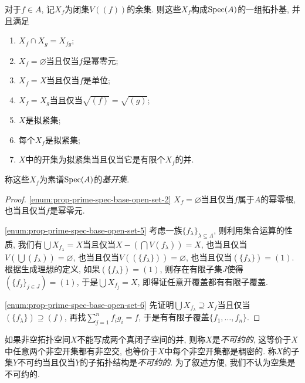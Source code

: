 \begin{proposition}\label{prop:primespecbaseopenset}
  对于$f\in A$, 记$X_f$为闭集$V((f))$的余集. 则这些$X_f$构成$\operatorname{Spec} (A)$的一组拓扑基, 并且满足
  \begin{enumerate}
    \item $X_f\cap X_g=X_{fg}$;
    \item\label{enum:prop-prime-spec-base-open-set-2} $X_f=\varnothing$当且仅当$f$是幂零元;
    \item $X_f=X$当且仅当$f$是单位;
    \item $X_f=X_g$当且仅当$\sqrt{(f)}=\sqrt{(g)}$;
    \item\label{enum:prop-prime-spec-base-open-set-5} $X$是拟紧集\footnotemark;
    \item\label{enum:prop-prime-spec-base-open-set-6} 每个$X_f$是拟紧集;
    \item $X$中的开集为拟紧集当且仅当它是有限个$X_f$的并.
  \end{enumerate}
  称这些$X_f$为素谱$\operatorname{Spec} (A)$的\emph{基开集}.
\end{proposition}

\begin{proof}
  \ref{enum:prop-prime-spec-base-open-set-2} $X_f=\varnothing$当且仅当$f$属于$A$的幂零根, 也当且仅当$f$是幂零元.

  \ref{enum:prop-prime-spec-base-open-set-5} 考虑一族$\{f_\lambda\}_{\lambda\subseteq \Lambda}$, 则利用集合运算的性质, 我们有$\bigcup X_{f_\lambda}=X$当且仅当$X-(\bigcap V(f_\lambda))=X$, 也当且仅当$V(\bigcup (f_\lambda))=\varnothing$, 也当且仅当$V((\{f_\lambda\}))=\varnothing$, 也当且仅当$(\{f_\lambda\})=(1)$. 根据生成理想的定义, 如果$(\{f_\lambda\})=(1)$, 则存在有限子集$J$使得$(\{f_j\}_{j\in J})=(1)$, 于是$\bigcup X_{f_j}=X$, 即得证任意开覆盖都有有限子覆盖.

  \ref{enum:prop-prime-spec-base-open-set-6} 先证明$\bigcup X_{f_\lambda}\supseteq X_f$当且仅当$(\{f_\lambda\})\supseteq (f)$, 再找$\sum_{j=1}^n f_ig_i = f$, 于是有有限子覆盖$\{f_1, \dotsc, f_n\}$.
\end{proof}

如果非空拓扑空间$X$不能写成两个真闭子空间的并, 则称$X$是\emph{不可约的}, 这等价于$X$中任意两个非空开集都有非空交, 也等价于$X$中每个非空开集都是稠密的\parencite[13, Exercise 19]{atiyah_introduction_1969}. 称$X$的子集$Y$不可约当且仅当$Y$的子拓扑结构是\emph{不可约的}. 为了叙述方便, 我们不认为空集是不可约的.

